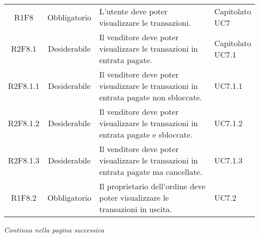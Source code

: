 \begin{table}[H]
\begin{tabular}{c | c | p{6cm} | p{4.1cm}}
        R1F8                                                              & Obbligatorio & L'utente deve poter visualizzare le transazioni.                                                                      & \Shortunderstack{Capitolato\\UC7\\}   \\
        R2F8.1                                                            & Desiderabile & Il venditore deve poter visualizzare le transazioni in entrata pagate.                                                & \Shortunderstack{Capitolato\\UC7.1\\} \\
        R2F8.1.1                                                          & Desiderabile & Il venditore deve poter visualizzare le transazioni in entrata pagate non sbloccate.                                  & UC7.1.1                               \\
        R2F8.1.2                                                          & Desiderabile & Il venditore deve poter visualizzare le transazioni in entrata pagate e sbloccate.                                    & UC7.1.2                               \\
        R2F8.1.3                                                          & Desiderabile & Il venditore deve poter visualizzare le transazioni in entrata pagate ma cancellate.                                  & UC7.1.3                               \\
        R1F8.2                                                            & Obbligatorio & Il proprietario dell'ordine deve poter visualizzare le transazioni in uscita.                                         & UC7.2                                 \\
    \end{tabular}
\end{table}
\begin{center}
    \textit{\small Continua nella pagina successiva}
\end{center}
